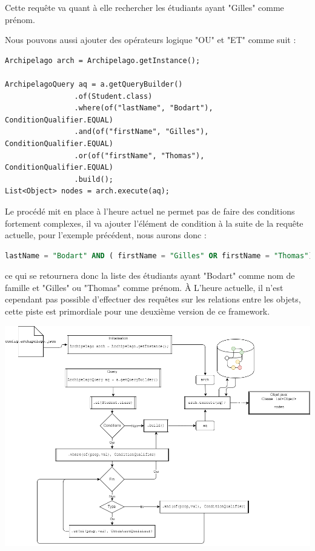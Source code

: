 \documentclass[a4paper,fleqn,12pt]{report}
\begin{document}
Cette requête va quant à elle rechercher les étudiants ayant "Gilles" comme prénom.

Nous pouvons aussi ajouter des opérateurs logique "OU" et "ET" comme suit :
\begin{lstlisting}
Archipelago arch = Archipelago.getInstance();

ArchipelagoQuery aq = a.getQueryBuilder()
                .of(Student.class)
                .where(of("lastName", "Bodart"), ConditionQualifier.EQUAL)
                .and(of("firstName", "Gilles"), ConditionQualifier.EQUAL)
                .or(of("firstName", "Thomas"), ConditionQualifier.EQUAL)
                .build();
List<Object> nodes = arch.execute(aq);
\end{lstlisting}

Le procédé mit en place à l'heure actuel ne permet pas de faire des conditions fortement complexes, il va ajouter l'élément de condition à la suite de la requête actuelle, pour l'exemple précédent, nous aurons donc : 

\begin{lstlisting}[language=SQL]
lastName = "Bodart" AND ( firstName = "Gilles" OR firstName = "Thomas")
\end{lstlisting}

ce qui se retournera donc la liste des étudiants ayant "Bodart" comme nom de famille et "Gilles" ou "Thomas" comme prénom. \`A L'heure actuelle, il n'est cependant pas possible d'effectuer des requêtes sur les relations entre les objets, cette piste est primordiale pour une deuxième version de ce framework.

\begin{center}
\includegraphics[scale=0.4]{figures/query.png}
\label{fig:Query}
\end{center}
\end{document}
